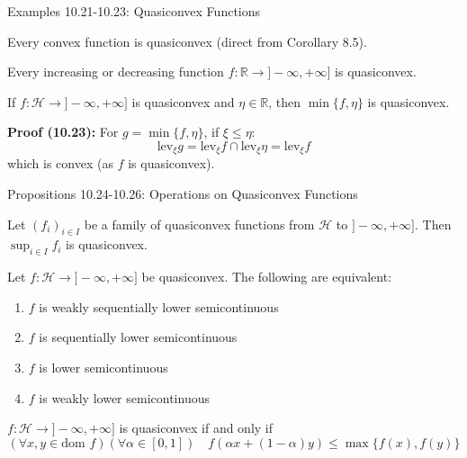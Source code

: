 \documentclass[aspectratio=169,10pt]{beamer}
\begin{document}
\begin{frame}{Examples 10.21-10.23: Quasiconvex Functions}
\begin{example}[10.21]
Every convex function is quasiconvex (direct from Corollary 8.5).
\end{example}

\begin{example}[10.22]
Every increasing or decreasing function $f: \mathbb{R} \to ]-\infty, +\infty]$ is quasiconvex.
\end{example}

\begin{example}[10.23]
If $f: \mathcal{H} \to ]-\infty, +\infty]$ is quasiconvex and $\eta \in \mathbb{R}$, then $\min\{f, \eta\}$ is quasiconvex.
\end{example}

\textbf{Proof (10.23):} For $g = \min\{f, \eta\}$, if $\xi \leq \eta$:
\[
\text{lev}_\xi g = \text{lev}_\xi f \cap \text{lev}_\xi \eta = \text{lev}_\xi f
\]
which is convex (as $f$ is quasiconvex).
\end{frame}

\begin{frame}{Propositions 10.24-10.26: Operations on Quasiconvex Functions}
\begin{proposition}[10.24]
Let $(f_i)_{i \in I}$ be a family of quasiconvex functions from $\mathcal{H}$ to $]-\infty, +\infty]$. Then $\sup_{i \in I} f_i$ is quasiconvex.
\end{proposition}

\begin{proposition}[10.25]
Let $f: \mathcal{H} \to ]-\infty, +\infty]$ be quasiconvex. The following are equivalent:
\begin{enumerate}
\item $f$ is weakly sequentially lower semicontinuous
\item $f$ is sequentially lower semicontinuous
\item $f$ is lower semicontinuous
\item $f$ is weakly lower semicontinuous
\end{enumerate}
\end{proposition}

\begin{proposition}[10.26]
$f: \mathcal{H} \to ]-\infty, +\infty]$ is quasiconvex if and only if
\[
(\forall x, y \in \text{dom } f)(\forall \alpha \in [0,1]) \quad f(\alpha x + (1-\alpha)y) \leq \max\{f(x), f(y)\}
\]
\end{proposition}
\end{frame}
\end{document}
